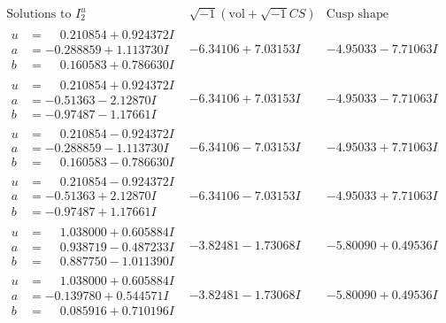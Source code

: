 \documentclass[1p]{elsarticle_modified}
\theoremstyle{definition}
\newcommand{\I}{\sqrt{-1}}
\begin{document}
$$\begin{array}{c|c|c}  
\text{Solutions to }I^u_{2}& \I (\text{vol} + \sqrt{-1}CS) & \text{Cusp shape}\\
 \hline 
\begin{aligned}
u &= \phantom{-}0.210854 + 0.924372 I \\
a &= -0.288859 + 1.113730 I \\
b &= \phantom{-}0.160583 + 0.786630 I\end{aligned}
 & -6.34106 + 7.03153 I & -4.95033 - 7.71063 I \\ \hline\begin{aligned}
u &= \phantom{-}0.210854 + 0.924372 I \\
a &= -0.51363 - 2.12870 I \\
b &= -0.97487 - 1.17661 I\end{aligned}
 & -6.34106 + 7.03153 I & -4.95033 - 7.71063 I \\ \hline\begin{aligned}
u &= \phantom{-}0.210854 - 0.924372 I \\
a &= -0.288859 - 1.113730 I \\
b &= \phantom{-}0.160583 - 0.786630 I\end{aligned}
 & -6.34106 - 7.03153 I & -4.95033 + 7.71063 I \\ \hline\begin{aligned}
u &= \phantom{-}0.210854 - 0.924372 I \\
a &= -0.51363 + 2.12870 I \\
b &= -0.97487 + 1.17661 I\end{aligned}
 & -6.34106 - 7.03153 I & -4.95033 + 7.71063 I \\ \hline\begin{aligned}
u &= \phantom{-}1.038000 + 0.605884 I \\
a &= \phantom{-}0.938719 - 0.487233 I \\
b &= \phantom{-}0.887750 - 1.011390 I\end{aligned}
 & -3.82481 - 1.73068 I & -5.80090 + 0.49536 I \\ \hline\begin{aligned}
u &= \phantom{-}1.038000 + 0.605884 I \\
a &= -0.139780 + 0.544571 I \\
b &= \phantom{-}0.085916 + 0.710196 I\end{aligned}
 & -3.82481 - 1.73068 I & -5.80090 + 0.49536 I \\ \hline\begin{aligned}

\end{aligned}
\end{array}$$
\end{document}
